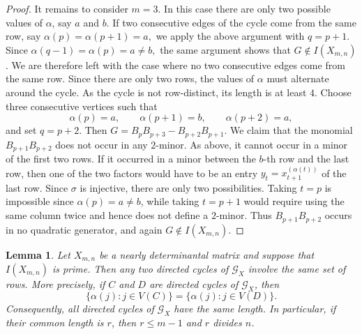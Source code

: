 \documentclass[12pt]{amsart}
\numberwithin{equation}{section}
\newtheorem{Lemma}[Theorem]{Lemma}
\begin{document}
\begin{proof}
It remains to consider $m=3$. In this case there are only two possible
values of $\alpha$, say $a$ and $b$. If two consecutive edges of the
cycle come from the same row, say $\alpha(p)=\alpha(p+1)=a,$ we apply the above argument with $q=p+1$. Since $\alpha(q-1)=\alpha(p)=a\neq b,$ the same argument shows that $G\notin I(X_{m,n})$. We are therefore left with the case where no two consecutive edges
come from the same row. Since there are only two rows, the values of
$\alpha$ must alternate around the cycle. As the cycle is not
row-distinct, its length is at least $4$. Choose three consecutive
vertices such that
\[
\alpha(p)=a,\qquad
\alpha(p+1)=b,\qquad
\alpha(p+2)=a,
\]
and set $q=p+2$. Then $G=B_pB_{p+3}-B_{p+2}B_{p+1}.$ We claim that the monomial $B_{p+1}B_{p+2}$ does not occur in any $2$-minor. As above, it cannot occur in a minor of the first two rows. If it occurred in a minor between
the $b$-th row and the last row, then one of the two factors would have
to be an entry $y_t=x_{t+1}^{(\alpha(t))}$ of the last row. Since $\sigma$ is injective, there are only two
possibilities. Taking $t=p$ is impossible since
$\alpha(p)=a\neq b$, while taking $t=p+1$ would require using the same
column twice and hence does not define a $2$-minor. Thus
$B_{p+1}B_{p+2}$ occurs in no quadratic generator, and again $G\notin I(X_{m,n}).$
\end{proof}




\begin{Lemma}\label{lem:cycles-same-rows}
Let $X_{m,n}$ be a nearly determinantal matrix and suppose that
$I(X_{m,n})$ is prime. Then any two directed cycles of
$\mathcal{G}_X$ involve the same set of rows. More precisely, if
$C$ and $D$ are directed cycles of $\mathcal{G}_X$, then
\[
\{\alpha(j):j\in V(C)\}
=
\{\alpha(j):j\in V(D)\}.
\]
Consequently, all directed cycles of $\mathcal{G}_X$ have the same
length. In particular, if their common length is $r$, then
$r\leq m-1$ and $r$ divides $n$.
\end{Lemma}
\end{document}
